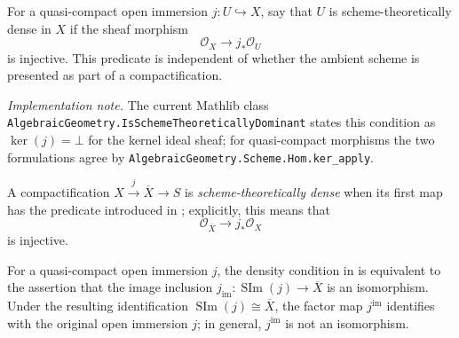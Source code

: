 \begin{definition}
  \label{def:nagata-scheme-theoretically-dense-open}

  For a quasi-compact open immersion $j\colon U\hookrightarrow X$, say that
  $U$ is scheme-theoretically dense in $X$ if the sheaf morphism
  \[
    \mathcal O_X\longrightarrow j_*\mathcal O_U
  \]
  is injective.  This predicate is independent of whether the ambient scheme
  is presented as part of a compactification.

  \emph{Implementation note.}  The current Mathlib class
  \texttt{AlgebraicGeometry.IsSchemeTheoreticallyDominant} states this
  condition as $\ker(j)=\bot$ for the kernel ideal sheaf; for quasi-compact
  morphisms the two formulations agree by
  \texttt{AlgebraicGeometry.Scheme.Hom.ker\_apply}.
\end{definition}

\begin{definition}
  \label{def:nagata-dense-compactification}

  A compactification $X\xrightarrow{j}\overline X\to S$ is
  \emph{scheme-theoretically dense} when its first map has the predicate
  introduced in ; explicitly,
  this means that
  \[
    \mathcal O_{\overline X}\longrightarrow j_*\mathcal O_X
  \]
  is injective.
\end{definition}

\begin{lemma}
  \label{lemma:nagata-dense-compactification-characterization}

  For a quasi-compact open immersion $j$, the density condition in
   is equivalent to the assertion that
  the image inclusion
  $j_{\mathrm{im}}\colon\operatorname{SIm}(j)\to\overline X$ is an
  isomorphism.  Under the resulting identification
  $\operatorname{SIm}(j)\cong\overline X$, the factor map
  $j^{\mathrm{im}}$ identifies with the original open immersion $j$; in
  general, $j^{\mathrm{im}}$ is not an isomorphism.
\end{lemma}

